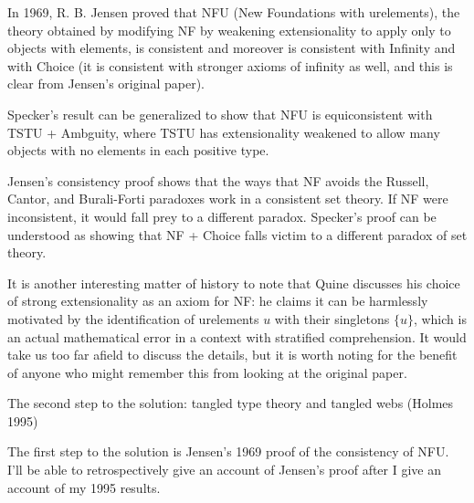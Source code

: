 \documentclass{slides}
\begin{document}
\begin{slide}

In 1969, R. B. Jensen proved that NFU (New Foundations with urelements), the theory obtained by modifying NF by weakening extensionality to apply only to objects with elements,
is consistent and moreover is consistent with Infinity and with Choice (it is consistent with stronger axioms of infinity as well, and this is clear from Jensen's original paper).

Specker's result can be generalized to show that NFU is equiconsistent with TSTU + Ambguity, where TSTU has extensionality weakened to allow many objects with no elements in each positive type.

Jensen's consistency proof shows that the ways that NF avoids the Russell, Cantor, and Burali-Forti paradoxes work in a consistent set theory.  If NF were inconsistent, it would fall prey to a different paradox.  Specker's proof can be understood as showing that NF + Choice falls victim to a different paradox of set theory.


\end{slide}

\begin{slide}

It is another interesting matter of history to note that Quine discusses his choice of strong extensionality as an axiom for NF:  he claims it can be harmlessly motivated by the identification of 
urelements $u$ with their singletons $\{u\}$, which is an actual mathematical error in a context with stratified comprehension.  It would take us too far afield to discuss the details, but it is worth noting for the benefit of anyone who might remember this from looking at the original paper.

\end{slide}

\begin{slide}

{\Large The second step to the solution:  tangled type theory and tangled webs (Holmes 1995)}

The first step to the solution is Jensen's 1969 proof of the consistency of NFU.  I'll be able to retrospectively give an account of Jensen's proof after I give an account of my 1995 results.

\end{slide}
\end{document}
